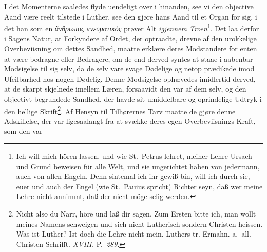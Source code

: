\documentclass[12pt]{book}
\newcommand{\opage}[1]{\marginnote{\footnotesize\textit{[#1]}}}
\begin{document}
\opage{68} \setcounter{footnote}{0}%
I det Momenterne saaledes flyde uendeligt over i hinanden, see vi den
objective Aand være reelt tilstede i Luther, see den gjøre hans Aand til et
Organ for sig, i det han som en \textit{ἄνθρωπος πνευματικὸς} prøver Alt
\emph{igjennem Troen}\footnote{Ich will mich hören lassen, und wie St.~Petrus
lehret, meiner Lehre Ursach und Grund beweisen für alle Welt, und sie
ungerichtet haben von jedermann, auch von allen Engeln. Denn sintemal ich ihr
gewiß bin, will ich durch sie, euer und auch der Engel (wie St.~Pauius
spricht) Richter seyn, daß wer meine Lehre nicht annimmt, daß der nicht möge
selig werden.}.
Det laa derfor i Sagens Natur, at Forkyndere af Ordet, der optraadte, drevne
af den urokkelige Overbeviisning om dettes Sandhed, maatte erklære deres
Modstandere for enten at være bedragne eller Bedragere, om de end derved
syntes at staae i aabenbar Modsigelse til sig selv, da de selv vare svage
Dødelige og netop prædikede imod Ufeilbarhed hos nogen Dødelig. Denne
Modsigelse ophævedes imidlertid derved, at de skarpt skjelnede imellem Læren,
forsaavidt den var af dem selv, og den objectivt begrundede Sandhed, der
havde sit umiddelbare og oprindelige Udtryk i den hellige
Skrift\footnote{Nicht also du Narr, höre und laß dir sagen. Zum Ersten bitte
ich, man wollt meines Namens schweigen und sich nicht Lutherisch sondern
Christen heissen. Was ist Luther? Ist doch die Lehre nicht mein. Luthers tr.
Ermahn. a.~all. Christen Schrifft. \textit{XVIII.} P.~\textit{289}.}. Af
Hensyn til Tilhørernes Tarv maatte de gjøre denne Adskillelse, der var
ligesaalangt fra at svække deres egen Overbeviisnings Kraft, som den var
\end{document}
